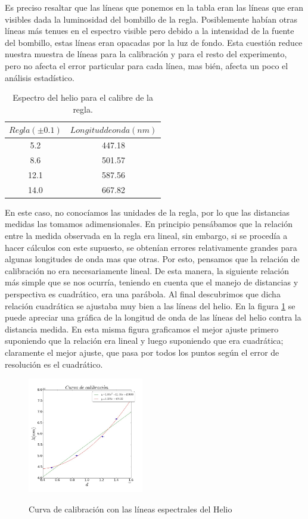 \documentclass[%
 reprint,
 amsmath,amssymb,
 aps,
]{revtex4-1}
\begin{document}
Es preciso resaltar que las líneas que ponemos en la tabla eran las líneas que eran visibles dada la luminosidad del bombillo de la regla. Posiblemente habían otras líneas más tenues en el espectro visible pero debido a la intensidad de la fuente del bombillo, estas líneas eran opacadas por la luz de fondo. Esta cuestión reduce nuestra muestra de líneas para la calibración y para el resto del experimento, pero no afecta el error particular para cada línea, mas bién, afecta un poco el análisis estadístico. \\

\begin{table}[h!]
\centering
 \begin{tabular}{|c|c|} 
 \hline
 $Regla (\pm0.1)$ & $Longitud de onda (nm)$ \\ [0.5ex] 
 \hline\hline
5.2 &		447.18\\
8.6 &		501.57\\
12.1 &		587.56\\
14.0 &		667.82\\
[1ex] 
 \hline
 \end{tabular}
 \caption{Espectro del helio para el calibre de la regla.}
 \label{table:helio}
\end{table}

En este caso, no conocíamos las unidades de la regla, por lo que las distancias medidas las tomamos adimensionales. En principio pensábamos que la relación entre la medida observada en la regla era lineal, sin embargo, si se procedía a hacer cálculos con este supuesto, se obtenían errores relativamente grandes para algunas longitudes de onda mas que otras. Por esto, pensamos que la relación de calibración no era necesariamente lineal. De esta manera, la siguiente relación más simple que se nos ocurría, teniendo en cuenta que el manejo de distancias y perspectiva es cuadrático, era una parábola. Al final descubrimos que dicha relación cuadrática se ajustaba muy bien a las líneas del helio. En la figura \ref{fig:calibre} se puede apreciar una gráfica de la longitud de onda de las líneas del helio contra la distancia medida. En esta misma figura graficamos el mejor ajuste primero suponiendo que la relación era lineal y luego suponiendo que era cuadrática; claramente el mejor ajuste, que pasa por todos los puntos según el error de resolución es el cuadrático.\\

\begin{figure}[h]
\caption{Curva de calibración con las líneas espectrales del Helio}
\centering
\includegraphics[width=0.45\textwidth]{calibre}
\label{fig:calibre}
\end{figure}
\end{document}
